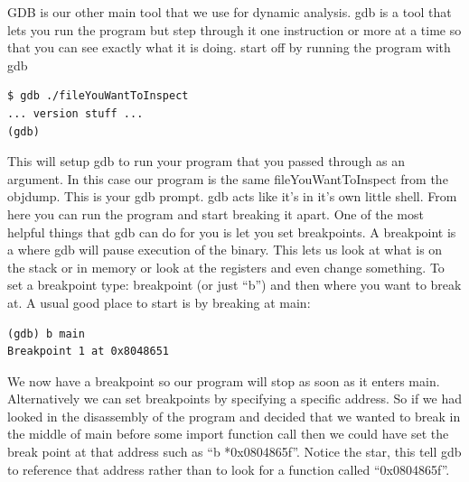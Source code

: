\documentclass{report}
\begin{document}
GDB is our other main tool that we use for dynamic analysis.  gdb is a tool that lets you run the program but step through it one instruction or more at a time so that you can see exactly what it is doing.  start off by running the program with gdb 
\begin{lstlisting}
$ gdb ./fileYouWantToInspect
... version stuff ...
(gdb) 
\end{lstlisting}
This will setup gdb to run your program that you passed through as an argument.  In this case our program is the same fileYouWantToInspect from the objdump.  
This is your gdb prompt. gdb acts like it's in it's own little shell.  From here you can run the program and start breaking it apart.  One of the most helpful things that gdb can do for you is let you set breakpoints.  A breakpoint is a where gdb will pause execution of the binary.  This lets us look at what is on the stack or in memory or look at the registers and even change something.
To set a breakpoint type: breakpoint (or just ``b'') and then where you want to break at.  A usual good place to start is by breaking at main:
\begin{lstlisting}
(gdb) b main
Breakpoint 1 at 0x8048651
\end{lstlisting}
We now have a breakpoint so our program will stop as soon as it enters main.  Alternatively we can set breakpoints by specifying a specific address.  So if we had looked in the disassembly of the program and decided that we wanted to break in the middle of main before some import function call then we could have set the break point at that address such as ``b *0x0804865f''. Notice the star, this tell gdb to reference that address rather than to look for a function called ``0x0804865f''.
\end{document}
